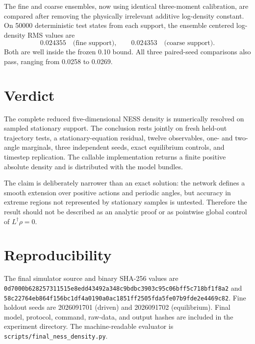 \documentclass[11pt]{article}
\begin{document}
The fine and coarse ensembles, now using identical three-moment calibration,
are compared after removing the physically irrelevant additive log-density
constant.  On 50000 deterministic test states
from each support, the ensemble centered log-density RMS values are
\begin{equation}
 0.024355\quad\text{(fine support)},\qquad
 0.024353\quad\text{(coarse support)}.
\end{equation}
Both are well inside the frozen 0.10 bound.  All three paired-seed comparisons
also pass, ranging from 0.0258 to 0.0269.

\section{Verdict}

The complete reduced five-dimensional NESS density is numerically resolved on
sampled stationary support.  The conclusion rests jointly on fresh held-out
trajectory tests, a stationary-equation residual, twelve observables, one- and
two-angle marginals, three independent seeds, exact equilibrium controls, and
timestep replication.  The callable implementation returns a finite positive
absolute density and is distributed with the model bundles.

The claim is deliberately narrower than an exact solution: the network defines
a smooth extension over positive actions and periodic angles, but accuracy in
extreme regions not represented by stationary samples is untested.  Therefore
the result should not be described as an analytic proof or as pointwise global
control of \(L^\dagger\rho=0\).

\section*{Reproducibility}

The final simulator source and binary SHA-256 values are
\nolinkurl{0d7000b628257311515e8edd43492a348c9bdbc3903c95c06bff5c718bf1f8a2}
and
\nolinkurl{58c22764eb864f156bc1df4a0190a0ac1851ff2505fda5fe07b9fde2e4469c82}.
Fine holdout seeds are 2026091701 (driven) and 2026091702 (equilibrium).
Final model, protocol, command, raw-data, and output hashes are included in the
experiment directory.  The machine-readable evaluator is
\nolinkurl{scripts/final_ness_density.py}.
\end{document}
